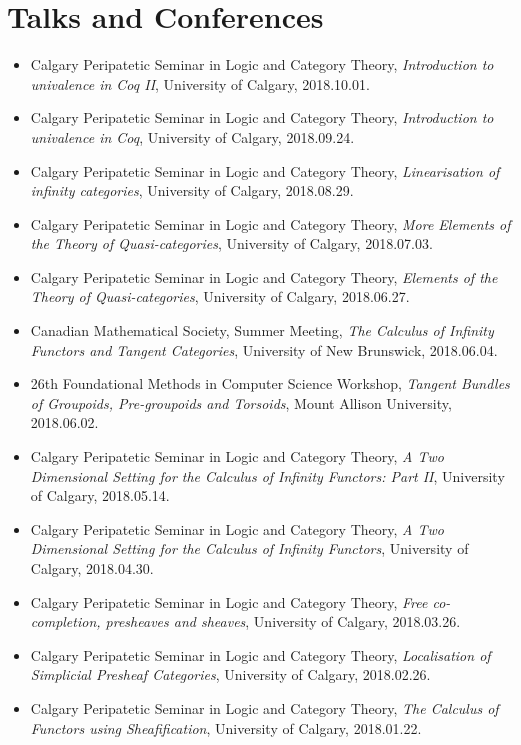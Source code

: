 \documentclass[10pt]{article}
\begin{document}
\section*{Talks and Conferences}
\begin{itemize}
    \item Calgary Peripatetic Seminar in Logic and Category Theory, \emph{Introduction to univalence in Coq II}, University of Calgary, 2018.10.01.
    \item Calgary Peripatetic Seminar in Logic and Category Theory, \emph{Introduction to univalence in Coq}, University of Calgary, 2018.09.24.
    \item Calgary Peripatetic Seminar in Logic and Category Theory, \emph{Linearisation of infinity categories}, University of Calgary, 2018.08.29.
    \item Calgary Peripatetic Seminar in Logic and Category Theory, \emph{More Elements of the Theory of Quasi-categories}, University of Calgary, 2018.07.03.
    \item Calgary Peripatetic Seminar in Logic and Category Theory, \emph{Elements of the Theory of Quasi-categories}, University of Calgary, 2018.06.27.
    \item Canadian Mathematical Society, Summer Meeting, \emph{The Calculus of Infinity Functors and Tangent Categories}, University of New Brunswick, 2018.06.04.
    \item 26th Foundational Methods in Computer Science Workshop, \emph{Tangent Bundles of Groupoids, Pre-groupoids and Torsoids}, Mount Allison University, 2018.06.02.
    \item Calgary Peripatetic Seminar in Logic and Category Theory, \emph{A Two Dimensional Setting for the Calculus of Infinity Functors: Part II}, University of Calgary, 2018.05.14.
    \item Calgary Peripatetic Seminar in Logic and Category Theory, \emph{A Two Dimensional Setting for the Calculus of Infinity Functors}, University of Calgary, 2018.04.30.
    \item Calgary Peripatetic Seminar in Logic and Category Theory, \emph{Free co-completion, presheaves and sheaves}, University of Calgary, 2018.03.26.
    \item Calgary Peripatetic Seminar in Logic and Category Theory, \emph{Localisation of Simplicial Presheaf Categories}, University of Calgary, 2018.02.26.
    \item Calgary Peripatetic Seminar in Logic and Category Theory, \emph{The Calculus of Functors using Sheafification}, University of Calgary, 2018.01.22.

\end{itemize}
\end{document}
